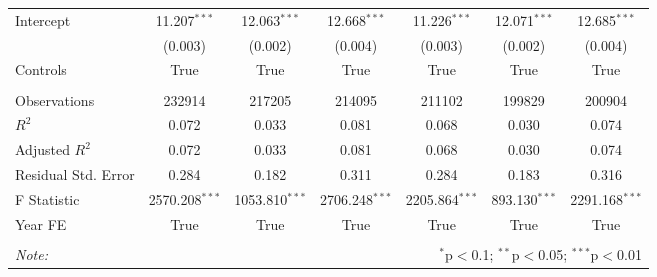 \begin{tabular}{@{\extracolsep{5pt}}lcccccc}
Intercept & 11.207$^{***}$ & 12.063$^{***}$ & 12.668$^{***}$ & 11.226$^{***}$ & 12.071$^{***}$ & 12.685$^{***}$ \\
& (0.003) & (0.002) & (0.004) & (0.003) & (0.002) & (0.004) \\
Controls & True & True & True & True & True & True \\
\hline \\[-1.8ex]
 Observations & 232914 & 217205 & 214095 & 211102 & 199829 & 200904 \\
 $R^2$ & 0.072 & 0.033 & 0.081 & 0.068 & 0.030 & 0.074 \\
 Adjusted $R^2$ & 0.072 & 0.033 & 0.081 & 0.068 & 0.030 & 0.074 \\
 Residual Std. Error & 0.284  & 0.182  & 0.311  & 0.284  & 0.183  & 0.316  \\
 F Statistic & 2570.208$^{***}$  & 1053.810$^{***}$  & 2706.248$^{***}$  & 2205.864$^{***}$  & 893.130$^{***}$  & 2291.168$^{***}$  \\
 Year FE & True & True & True & True & True & True \\
\hline
\hline \\[-1.8ex]
\textit{Note:} & \multicolumn{6}{r}{$^{*}$p$<$0.1; $^{**}$p$<$0.05; $^{***}$p$<$0.01} \\
\end{tabular}
